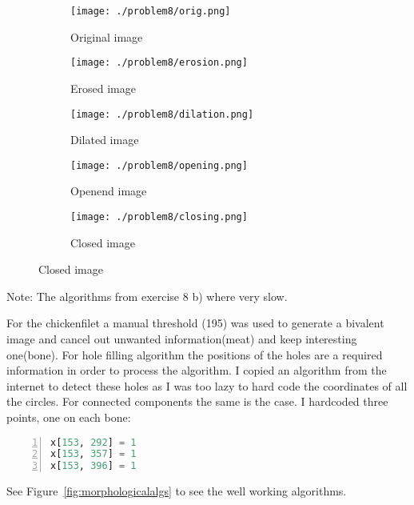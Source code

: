 \documentclass[a4paper]{scrartcl}
\begin{document}
\begin{figure}[h]
  \centering
  \caption{}
  \label{fig:erosiondelation}
  \begin{subfigure}[t]{0.4\textwidth}
    \texttt{[image: ./problem8/orig.png]}
    \caption{Original image}
  \end{subfigure}
  \begin{subfigure}[t]{0.4\textwidth}
    \texttt{[image: ./problem8/erosion.png]}
    \caption{Erosed image}
  \end{subfigure}
  \begin{subfigure}[t]{0.4\textwidth}
    \texttt{[image: ./problem8/dilation.png]}
    \caption{Dilated image}
  \end{subfigure}
  \begin{subfigure}[t]{0.4\textwidth}
    \texttt{[image: ./problem8/opening.png]}
    \caption{Openend image}
  \end{subfigure}
  \begin{subfigure}[t]{0.4\textwidth}
    \texttt{[image: ./problem8/closing.png]}
    \caption{Closed image}
  \end{subfigure}
\end{figure}

Note: The algorithms from exercise 8 b) where very slow.

For the chickenfilet a manual threshold (195) was used to generate a bivalent image and cancel out unwanted information(meat) and keep interesting one(bone). For hole filling algorithm the positions of the holes are a required information in order to process the algorithm. I copied an algorithm from the internet to detect these holes as I was too lazy to hard code the coordinates of all the circles.
For connected components the same is the case. I hardcoded three points, one on each bone:

\begin{lstlisting}[frame=single, backgroundcolor=\color{light-gray}, basicstyle=\footnotesize\ttfamily, language=Python, numbers=left, numberstyle=\tiny\color{black},caption= {A desciption of the listing}]
x[153, 292] = 1
x[153, 357] = 1
x[153, 396] = 1
\end{lstlisting}

See Figure~\ref{fig:morphologicalalgs} to see the well working algorithms.
\end{document}
